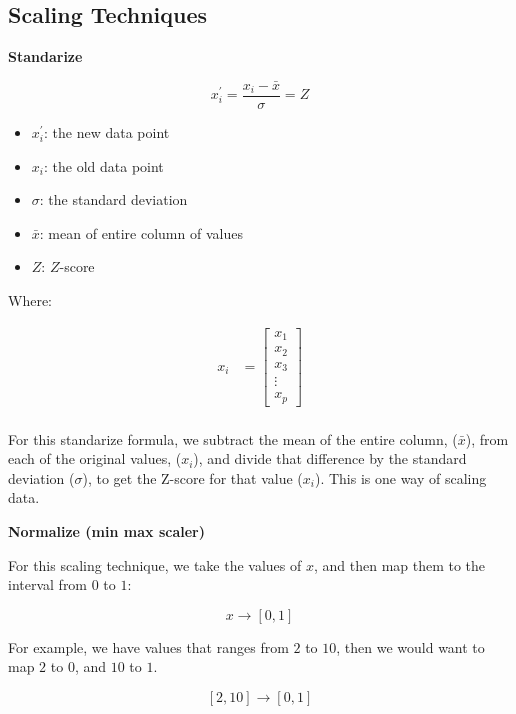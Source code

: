 \subsection{Scaling Techniques}
\begin{outline}[enumerate]
\1 \textbf{Standarize}

\[
x_i^{\prime} = \frac{x_i - \bar{x}}{\sigma} = Z
\]

\begin{itemize}
    \item $x_i^{\prime}$: the new data point  
    \item $x_i$: the old data point  
    \item $\sigma$: the standard deviation
    \item $\bar{x}$: mean of entire column of values
    \item $Z$: $Z$-score
\end{itemize}

Where:

\begin{align*}
x_i &= \begin{bmatrix}
        x_{1} \\
        x_{2} \\
        x_{3} \\
        \vdots \\
        x_{p}
        \end{bmatrix} \\
\end{align*}

For this standarize formula, we subtract the mean of the entire column, ($\bar{x}$), from each of the original values, ($x_i$), and divide that difference by the standard deviation ($\sigma$), to get the
Z-score for that value ($x_i$). This is one way of scaling data.


\1 \textbf{Normalize (min max scaler)}

For this scaling technique, we take the values of $x$, and then map them to the interval from $0$ to $1$:

\[
    x \rightarrow [0,1]
\] 

For example, we have values that ranges from $2$ to $10$, then we would want to map $2$ to $0$, and $10$ to $1$.

\[
    [2,10] \rightarrow [0,1]
\] 

\begin{center}
\end{center}
\end{outline}
